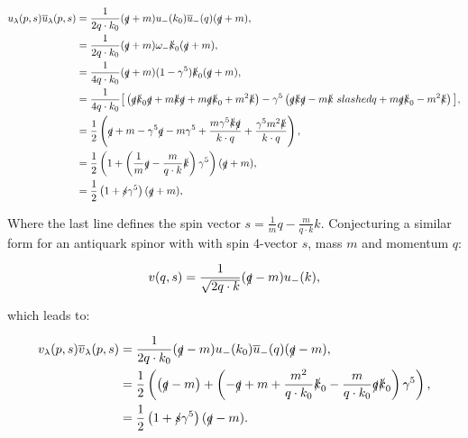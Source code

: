 	\begin{subequations}
	\begin{align*}
		u_\lambda(p,s)\overline{u}_\lambda(p,s) &= \frac{1}{2q\cdot k_0}(\slashed q + m) u_-(k_0)\overline{u}_-(q)(\slashed q + m),\\
		                                        &= \frac{1}{2q\cdot k_0}(\slashed q + m) \omega_-\slashed k_0 (\slashed q + m), \\
		                                        &= \frac{1}{4q\cdot k_0}(\slashed q + m) (1-\gu{5})\slashed k_0 (\slashed q + m), \\
		                                        &= \frac{1}{4q\cdot k_0}\big[\left(\slashed q \slashed k_0 \slashed q + m\slashed k\slashed q + m\slashed q \slashed k_0 + m^2 \slashed k\right)-\gu{5}\left(\slashed q\slashed k\slashed q - m\slashed k\	slashed q + m\slashed q\slashed k_0 - m^2\slashed k\right)\big], \\
		                                        &= \half\left(\slashed q + m - \gu{5}\slashed q - m\gu{5} + \frac{m\gu{5}\slashed k\slashed q}{k\cdot q} + \frac{\gu{5}m^2\slashed k}{k\cdot q}\right),\\
		                                        &= \half\left(1+\left(\frac{1}{m}\slashed q - \frac{m}{q\cdot k}\slashed k\right)\gu{5}\right)(\slashed q + m),\\
		                                        &= \half\left(1+\slashed s\gu{5}\right)(\slashed q + m),\\
	\end{align*}
	\end{subequations}

	Where the last line defines the spin vector $s = \frac{1}{m} q - \frac{m}{q\cdot k}k$.  Conjecturing a similar form for an antiquark spinor with with spin 4-vector $s$, mass $m$ and momentum $q$:

	\begin{equation}
		\label{v_def}
		v(q, s) = \frac{1}{\sqrt{2q\cdot k}}(\slashed q - m)u_-(k),
	\end{equation}

	which leads to:

	\begin{subequations}
	\begin{align*}
		v_\lambda(p,s)\overline{v}_\lambda(p,s) &= \frac{1}{2q\cdot k_0}(\slashed q - m) u_-(k_0)\overline{u}_-(q)(\slashed q - m),\\
		                                        &= \frac{1}{2}\left(\left(\slashed q - m\right) + \left(-\slashed q + m + \frac{m^2}{q\cdot k_0}\slashed k_0 - \frac{m}{q\cdot k_0}\slashed q\slashed k_0 \right)\gamma^{5}\right), \\
		                                        &= \frac{1}{2}\left(1+\slashed s\gamma^{5}\right)(\slashed q - m).\\
	\end{align*}
	\end{subequations}

